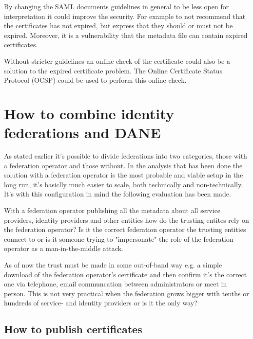 By changing the SAML documents guidelines in general to be less open for interpretation it could improve the security. 
For example to not recommend that the certificates has not expired, but express that they should or must not be expired. 
Moreover, it is a vulnerability that the metadata file can contain expired certificates.

Without stricter guidelines an online check of the certificate could also be a solution to the expired certificate problem. 
The Online Certificate Status Protocol (OCSP) \cite{rfc:6277} could be used to perform this online check.

\section{How to combine identity federations and DANE}
As stated earlier it's possible to divide federations into two categories, those with a federation operator and those without.
In the analysis that has been done the solution with a federation operator is the most probable and viable setup in the long run, it's basiclly much easier to scale, both technically and non-technically.
It's with this configuration in mind the following evaluation has been made.


With a federation operator publishing all the metadata about all service providers, identity providers and other entities how do the trusting entites rely on the federation operator?
Is it the correct federation operator the trusting entities connect to or is it someone trying to "impersonate" the role of the federation operator as a man-in-the-middle attack.

As of now the trust must be made in some out-of-band way e.g. a simple download of the federation operator's certificate and then confirm it's the correct one via telephone, email communcation between administrators or meet in person.
This is not very practical when the federation grows bigger with tenths or hundreds of service- and identity providers or is it the only way?
\subsection{How to publish certificates}
